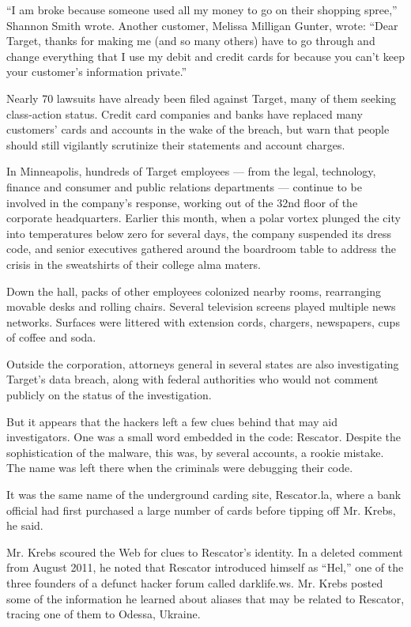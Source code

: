 ``I am broke because someone used all my money to go on their shopping
spree,'' Shannon Smith wrote. Another customer, Melissa Milligan Gunter,
wrote: ``Dear Target, thanks for making me (and so many others) have to
go through and change everything that I use my debit and credit cards
for because you can't keep your customer's information private.''

Nearly 70 lawsuits have already been filed against Target, many of them
seeking class-action status. Credit card companies and banks have
replaced many customers' cards and accounts in the wake of the breach,
but warn that people should still vigilantly scrutinize their statements
and account charges.

In Minneapolis, hundreds of Target employees --- from the legal,
technology, finance and consumer and public relations departments ---
continue to be involved in the company's response, working out of the
32nd floor of the corporate headquarters. Earlier this month, when a
polar vortex plunged the city into temperatures below zero for several
days, the company suspended its dress code, and senior executives
gathered around the boardroom table to address the crisis in the
sweatshirts of their college alma maters.

Down the hall, packs of other employees colonized nearby rooms,
rearranging movable desks and rolling chairs. Several television screens
played multiple news networks. Surfaces were littered with extension
cords, chargers, newspapers, cups of coffee and soda.

Outside the corporation, attorneys general in several states are also
investigating Target's data breach, along with federal authorities who
would not comment publicly on the status of the investigation.

But it appears that the hackers left a few clues behind that may aid
investigators. One was a small word embedded in the code: Rescator.
Despite the sophistication of the malware, this was, by several
accounts, a rookie mistake. The name was left there when the criminals
were debugging their code.

It was the same name of the underground carding site, Rescator.la, where
a bank official had first purchased a large number of cards before
tipping off Mr. Krebs, he said.

Mr. Krebs scoured the Web for clues to Rescator's identity. In a deleted
comment from August 2011, he noted that Rescator introduced himself as
``Hel,'' one of the three founders of a defunct hacker forum called
darklife.ws. Mr. Krebs posted some of the information he learned about
aliases that may be related to Rescator, tracing one of them to Odessa,
Ukraine.

